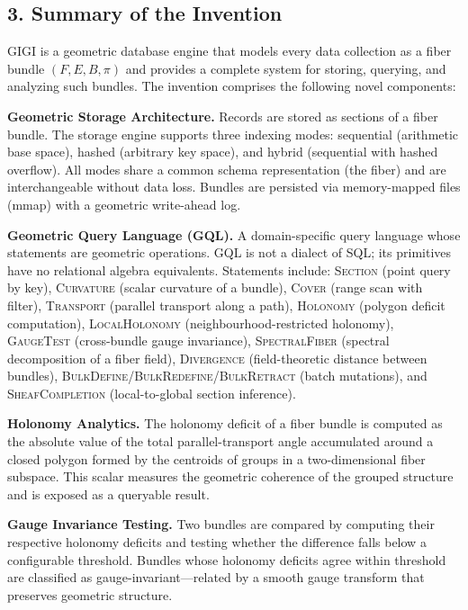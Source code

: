 \documentclass[11pt,letterpaper]{article}
\begin{document}
\subsection*{3. Summary of the Invention}

GIGI is a geometric database engine that models every data collection as a fiber bundle $(F, E, B, \pi)$ and provides a complete system for storing, querying, and analyzing such bundles. The invention comprises the following novel components:

\textbf{Geometric Storage Architecture.} Records are stored as sections of a fiber bundle. The storage engine supports three indexing modes: sequential (arithmetic base space), hashed (arbitrary key space), and hybrid (sequential with hashed overflow). All modes share a common schema representation (the fiber) and are interchangeable without data loss. Bundles are persisted via memory-mapped files (mmap) with a geometric write-ahead log.

\textbf{Geometric Query Language (GQL).} A domain-specific query language whose statements are geometric operations. GQL is not a dialect of SQL; its primitives have no relational algebra equivalents. Statements include: \textsc{Section} (point query by key), \textsc{Curvature} (scalar curvature of a bundle), \textsc{Cover} (range scan with filter), \textsc{Transport} (parallel transport along a path), \textsc{Holonomy} (polygon deficit computation), \textsc{LocalHolonomy} (neighbourhood-restricted holonomy), \textsc{GaugeTest} (cross-bundle gauge invariance), \textsc{SpectralFiber} (spectral decomposition of a fiber field), \textsc{Divergence} (field-theoretic distance between bundles), \textsc{BulkDefine}/\allowbreak\textsc{BulkRedefine}/\allowbreak\textsc{BulkRetract} (batch mutations), and \textsc{SheafCompletion} (local-to-global section inference).

\textbf{Holonomy Analytics.} The holonomy deficit of a fiber bundle is computed as the absolute value of the total parallel-transport angle accumulated around a closed polygon formed by the centroids of groups in a two-dimensional fiber subspace. This scalar measures the geometric coherence of the grouped structure and is exposed as a queryable result.

\textbf{Gauge Invariance Testing.} Two bundles are compared by computing their respective holonomy deficits and testing whether the difference falls below a configurable threshold. Bundles whose holonomy deficits agree within threshold are classified as gauge-invariant---related by a smooth gauge transform that preserves geometric structure.
\end{document}

